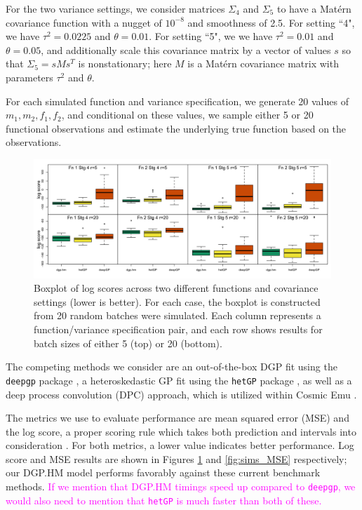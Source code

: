 \documentclass[11pt]{article}
\begin{document}
For the two variance settings, we consider matrices $\Sigma_4$ and $\Sigma_5$ to have a Mat\'ern covariance function with a nugget of $10^{-8}$ and smoothness of 2.5. For setting ``4", we have $\tau^2=0.0225$ and $\theta=0.01$. For setting ``5", we we have $\tau^2=0.01$ and $\theta=0.05$, and additionally scale this covariance matrix by a vector of values $s$ so that $\Sigma_5 = s M s^T$ is nonstationary; here $M$ is a Mat\'ern covariance matrix with parameters $\tau^2$ and $\theta$.

For each simulated function and variance specification, we generate 20 values of $m_1, m_2, f_1, f_2$, and conditional on these values, we sample either 5 or 20 functional observations and estimate the underlying true function based on the observations.

\begin{figure}[t]
    \centering
    \includegraphics[width=6in]{sims_logS.png}
    \caption{Boxplot of log scores across two different functions and covariance settings (lower is better). For each case, the boxplot is constructed from 20 random batches were simulated. Each column represents a function/variance specification pair, and each row shows results for batch sizes of either 5 (top) or 20 (bottom).}
    \label{fig:sims_logS}
\end{figure}

The competing methods we consider are an out-of-the-box DGP fit using the \texttt{deepgp} package \citep{sauer2023active}, a heteroskedastic GP fit using the \texttt{hetGP} package \citep{binois2018practical, binois2021hetgp}, as well as a deep process convolution (DPC) approach, which is utilized within Cosmic Emu \citep{moran2023mira}. 

The metrics we use to evaluate performance are mean squared error (MSE) and the log score, a proper scoring rule which takes both prediction and intervals into consideration \citep{gneiting2007strictly}. For both metrics, a lower value indicates better performance. Log score and MSE results are shown in Figures \ref{fig:sims_logS} and \ref{fig:sims_MSE} respectively; our DGP.HM model performs favorably against these current benchmark methods. \textcolor{magenta}{If we mention that DGP.HM timings speed up compared to \texttt{deepgp}, we would also need to mention that \texttt{hetGP} is much faster than both of these.}
\end{document}
